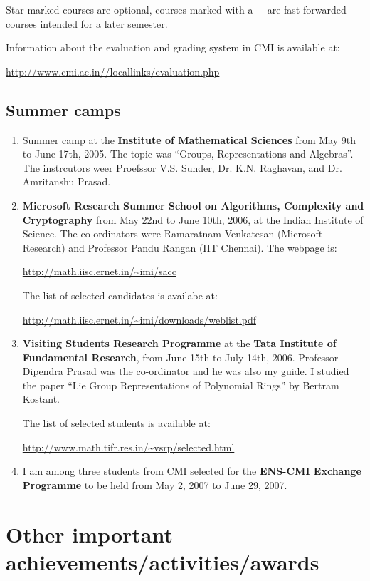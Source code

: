 \documentclass[a4paper]{amsart}
\begin{document}
Star-marked courses are optional, courses marked with a $+$ are
fast-forwarded courses intended for a later semester.

Information about the evaluation and grading system in CMI is available at:

\url{http://www.cmi.ac.in//locallinks/evaluation.php}

\subsection{Summer camps}

\begin{enumerate}

\item Summer camp at the {\bf Institute of Mathematical Sciences} from May
  9th to June 17th, 2005. The topic was ``Groups, Representations and
  Algebras''. The instrcutors weer Proefssor V.S. Sunder, Dr. K.N.
  Raghavan, and Dr. Amritanshu Prasad.

\item {\bf Microsoft Research Summer School on Algorithms, Complexity
    and Cryptography} from May 22nd to June 10th, 2006, at the Indian
  Institute of Science. The co-ordinators were Ramaratnam Venkatesan
  (Microsoft Research) and Professor Pandu Rangan (IIT Chennai). The
  webpage is:

  \url{http://math.iisc.ernet.in/~imi/sacc}

  The list of selected candidates is availabe at:

  \url{http://math.iisc.ernet.in/~imi/downloads/weblist.pdf}

\item {\bf Visiting Students Research Programme} at the 
  {\bf Tata Institute of Fundamental Research}, 
  from June 15th to July 14th, 2006. Professor
  Dipendra Prasad was the co-ordinator and he was also my guide. I
  studied the paper ``Lie Group Representations of Polynomial Rings''
  by Bertram Kostant.

  The list of selected students is available at:

  \url{http://www.math.tifr.res.in/~vsrp/selected.html}

\item I am among three students from CMI selected for the {\bf ENS-CMI
    Exchange Programme} to be held from May 2, 2007 to June 29, 2007.

\end{enumerate}

\section{Other important achievements/activities/awards}
\end{document}

